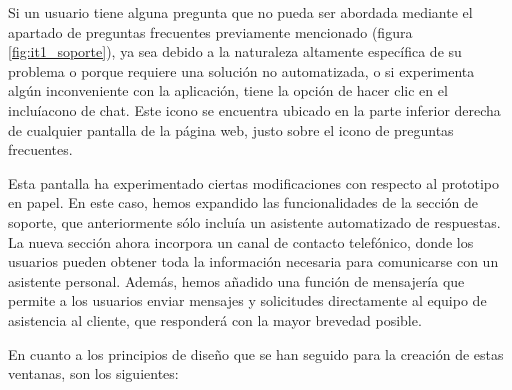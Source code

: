 Si un usuario tiene alguna pregunta que no pueda ser abordada mediante el apartado de preguntas frecuentes previamente
mencionado (figura \ref{fig:it1_soporte}), ya sea debido a la naturaleza altamente específica de su problema o porque requiere una solución no
automatizada, o si experimenta algún inconveniente con la aplicación, tiene la opción de hacer clic en el incluíacono de
chat. Este icono se encuentra ubicado en la parte inferior derecha de cualquier pantalla de la página web, justo sobre
el icono de preguntas frecuentes.

Esta pantalla ha experimentado ciertas modificaciones con respecto al prototipo en papel. En este caso, hemos
expandido las funcionalidades de la sección de soporte, que anteriormente sólo incluía un asistente automatizado
de respuestas. La nueva sección ahora incorpora un canal de contacto telefónico, donde los usuarios pueden obtener
toda la información necesaria para comunicarse con un asistente personal. Además, hemos añadido una función de
mensajería que permite a los usuarios enviar mensajes y solicitudes directamente al equipo de asistencia al cliente,
que responderá con la mayor brevedad posible.

En cuanto a los principios de diseño que se han seguido para la creación de estas ventanas, son los siguientes:


